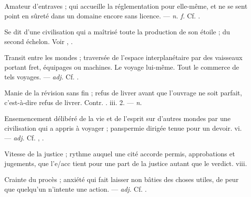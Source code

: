  Amateur d'entraves ; qui accueille la réglementation pour elle-même, et ne se sent point en sûreté dans un domaine encore sans licence.  ---  \textit{n. f.} Cf. .

 Se dit d'une civilisation qui a maîtrisé toute la production de son étoile ; du second échelon. Voir , .

 Transit entre les mondes ; traversée de l'espace interplanétaire par des vaisseaux portant fret, équipages ou machines.  Le voyage lui-même.   Tout le commerce de tels voyages. ---  \textit{adj.} Cf. .

 Manie de la révision sans fin ; refus de livrer avant que l'ouvrage ne soit parfait, c'est-à-dire refus de livrer. Contr. .   iii. 2. ---  \textit{n.}

 Ensemencement délibéré de la vie et de l'esprit sur d'autres mondes par une civilisation qui a appris à voyager ; panspermie dirigée tenue pour un devoir.   vi. ---  \textit{adj.} Cf. , .

 Vitesse de la justice ; rythme auquel une cité accorde permis, approbations et jugements, que l'e/acc tient pour une part de la justice autant que le verdict.   viii.

 Crainte du procès ; anxiété qui fait laisser non bâties des choses utiles, de peur que quelqu'un n'intente une action. ---  \textit{adj.} Cf. .

